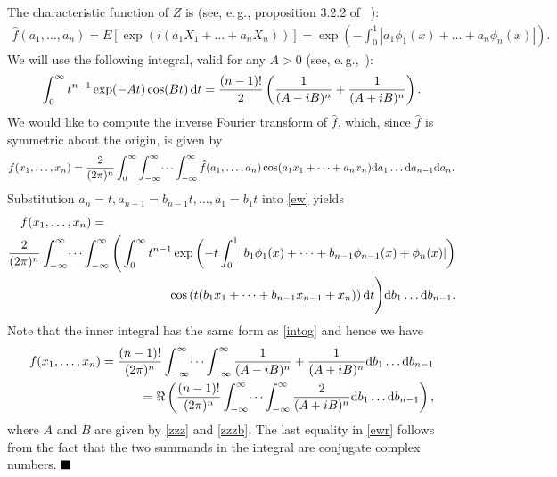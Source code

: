 \documentclass[11pt]{article}
\def\({\left(} \def\){\right)} \def\hatU{\widehat{U}}
\newenvironment{prf}[1]{\noindent{\bf{Proof #1\\}}}{$\hfill\blacksquare$\nopagebreak[4]\vskip 0.3cm}
\newcommand\BPRF[1][:]{\begin{prf}{#1}}
\def\EPRF{\end{prf}}
\begin{document}
\BPRF The characteristic function of $Z$ is (see, e.\,g.,
proposition 3.2.2 of ~\cite{ST94}):
\begin{equation*}
\begin{split}
\hat{f}(a_1,\dots,a_n)=E[\exp(i(a_1X_1+\dots+a_nX_n))]=
\exp\(-\int_0^1 \left| a_1\phi_1(x)+\dots+a_n\phi_n(x) \right|\).
\end{split}
\end{equation*}
We will use the following integral, valid for any $A>0$ (see,
e.\,g.,~\cite{GR07}):
\begin{equation}\label{intog}
\int_0^\infty t^{n-1} \exp(-At) \cos(Bt)\,{\rm d}t = \frac{(n-1)!}{2}\(\frac{1}{(A-iB)^n}+\frac{1}{(A+iB)^n}\).
\end{equation}
We would like to compute the inverse Fourier transform of $\hat{f}$, which, since
$\hat{f}$ is symmetric about the origin, is given by
\begin{equation}\label{ew}
f(x_1,\dots,x_n)=
\frac{2}{(2\pi)^n}\int_{0}^\infty\int_{-\infty}^\infty\dots\int_{-\infty}^\infty
\hat{f}(a_1,\dots,a_n)\cos(a_1x_1+\dots+a_nx_n)
{\rm d}a_1 \dots {\rm d}a_{n-1} {\rm d}a_n.
\end{equation}
Substitution $a_n=t,a_{n-1}=b_{n-1}t,\dots,a_1=b_1t$ into \eqref{ew} yields
\begin{equation*}
\begin{split}
f(x_1,\dots,x_n)=\phantom{XXXXXXXXXXXXXXXXXXXXXXXXXXXXXXX}\\
\frac{2}{(2\pi)^n}
\int_{-\infty}^\infty\dots\int_{-\infty}^\infty
\Bigg(\int_{0}^\infty
t^{n-1}\exp\(-t \int_0^1 \left| b_1\phi_1(x)+\dots+b_{n-1}\phi_{n-1}(x) + \phi_n(x) \right|\)
\\
\cos\(t(b_1x_1 + \dots + b_{n-1} x_{n-1} + x_n)\)
{\rm d}t\Bigg)
{\rm d}b_1 \dots {\rm d}b_{n-1}.
\end{split}
\end{equation*}
Note that the inner integral has the same form as \eqref{intog} and hence
we have
\begin{equation}\label{ewr}
\begin{split}
f(x_1,\dots,x_n)=
\frac{(n-1)!}{(2\pi)^n}
\int_{-\infty}^\infty\dots\int_{-\infty}^\infty
\frac{1}{(A-iB)^n}+\frac{1}{(A+iB)^n}
{\rm d}b_1 \dots {\rm d}b_{n-1}\\
=\Re\(\frac{(n-1)!}{(2\pi)^n}
\int_{-\infty}^\infty\dots\int_{-\infty}^\infty
\frac{2}{(A+iB)^n}
{\rm d}b_1 \dots {\rm d}b_{n-1}\),
\end{split}
\end{equation}
where $A$ and $B$ are given by \eqref{zzz} and \eqref{zzzb}. The
last equality in \eqref{ewr} follows from the fact that the two
summands in the integral are conjugate complex numbers.
\EPRF
\end{document}
